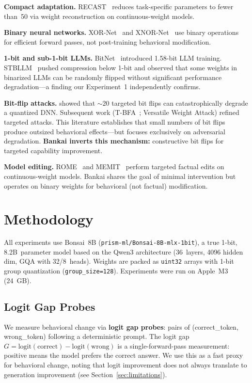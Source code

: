 \documentclass[11pt,a4paper]{article}
\begin{document}
\textbf{Compact adaptation.}
RECAST~\citep{xu2024recast} reduces task-specific parameters to fewer
than~50 via weight reconstruction on continuous-weight models.

\textbf{Binary neural networks.}
XOR-Net~\citep{bulat2020xornet} and XNOR-Net~\citep{rastegari2016xnor}
use binary operations for efficient forward passes, not post-training
behavioral modification.

\textbf{1-bit and sub-1-bit LLMs.}
BitNet~\citep{wang2023bitnet} introduced 1.58-bit LLM training.
STBLLM~\citep{dong2024stbllm} pushed compression below 1-bit and
observed that some weights in binarized LLMs can be randomly flipped
without significant performance degradation---a finding our
Experiment~1 independently confirms.

\textbf{Bit-flip attacks.}
\citet{rakin2019bitflip} showed that ${\sim}20$ targeted bit flips can
catastrophically degrade a quantized DNN. Subsequent work
(T-BFA~\citep{bai2021tbfa}; Versatile Weight Attack) refined targeted
attacks. This literature establishes that small numbers of bit flips
produce outsized behavioral effects---but focuses exclusively on
adversarial degradation. \textbf{Bankai inverts this mechanism:}
constructive bit flips for targeted capability improvement.

\textbf{Model editing.}
ROME~\citep{meng2022rome} and MEMIT~\citep{meng2023memit} perform
targeted factual edits on continuous-weight models. Bankai shares
the goal of minimal intervention but operates on binary weights for
behavioral (not factual) modification.

\section{Methodology}

All experiments use Bonsai~8B (\texttt{prism-ml/Bonsai-8B-mlx-1bit}),
a true 1-bit, 8.2B~parameter model based on the Qwen3 architecture
(36~layers, 4096 hidden dim, GQA with 32/8~heads). Weights are packed
as \texttt{uint32} arrays with 1-bit group quantization
(\texttt{group\_size=128}). Experiments were run on Apple~M3 (24~GB).

\subsection{Logit Gap Probes}

We measure behavioral change via \textbf{logit gap probes}: pairs of
(correct\_token, wrong\_token) following a deterministic prompt. The
logit gap $G = \text{logit}(\text{correct}) - \text{logit}(\text{wrong})$
is a single-forward-pass measurement: positive means the model prefers
the correct answer. We use this as a fast proxy for behavioral change,
noting that logit improvement does not always translate to generation
improvement (see Section~\ref{sec:limitations}).
\end{document}
